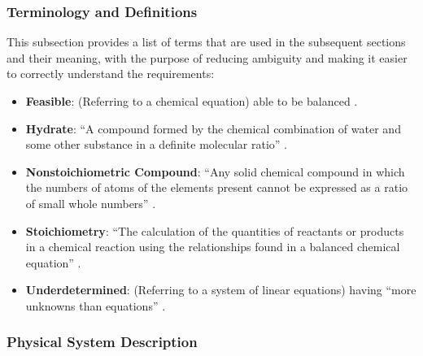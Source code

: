 \documentclass[12pt]{article}
\begin{document}
\subsubsection{Terminology and  Definitions} \label{sec_termsDefs}
This subsection provides a list of terms that are used in the subsequent
sections and their meaning, with the purpose of reducing ambiguity and making it
easier to correctly understand the requirements:

\begin{itemize}
  \item \textbf{Feasible}: (Referring to a chemical equation) able to be
        balanced \cite{hamid_balancing_2019}.

  \item \textbf{Hydrate}: ``A compound formed by the chemical combination of water
        and some other substance in a definite molecular ratio''
        \cite{harpercollins_publishers_hydrate_nodate}.

  \item \textbf{Nonstoichiometric Compound}: ``Any solid chemical compound in
        which the numbers of atoms of the elements present cannot be expressed as a
        ratio of small whole numbers''
        \cite{the_editors_of_encyclopaedia_britannica_nonstoichiometric_2010}.

  \item \textbf{Stoichiometry}: ``The calculation of the quantities of reactants
        or products in a chemical reaction using the relationships found in a balanced
        chemical equation'' \cite[p. 337]{lund_introduction_2023}.

  \item \textbf{Underdetermined}: (Referring to a system of linear equations)
        having ``more unknowns than equations'' \cite{colbry_matrix_2023}.

\end{itemize}

\subsubsection{Physical System Description} \label{sec_phySystDesc}
\end{document}
